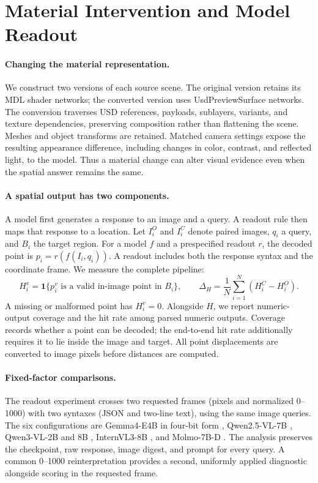\section{Material Intervention and Model Readout}
\label{sec:method}

\paragraph{Changing the material representation.}
We construct two versions of each source scene. The original version retains
its MDL shader networks; the converted version uses UsdPreviewSurface networks.
The conversion traverses USD references, payloads, sublayers, variants, and
texture dependencies, preserving composition rather than flattening the scene.
Meshes and object transforms are retained. Matched camera settings expose the
resulting appearance difference, including changes in color, contrast, and
reflected light, to the model. Thus a material change can alter visual evidence
even when the spatial answer remains the same.

\paragraph{A spatial output has two components.}
A model first generates a response to an image and a query. A readout rule then
maps that response to a location. Let $I_i^O$ and $I_i^C$ denote paired images,
$q_i$ a query, and $B_i$ the target region. For a model $f$ and a prespecified
readout $r$, the decoded point is $p_i=r(f(I_i,q_i))$. A readout includes both
the response syntax and the coordinate frame. We measure the complete pipeline:
\begin{equation}
 H_i^v = \mathbf{1}\{p_i^v\text{ is a valid in-image point in } B_i\},
 \qquad
 \Delta_H = \frac{1}{N}\sum_{i=1}^{N}(H_i^C-H_i^O).
 \label{eq:hit}
\end{equation}
A missing or malformed point has $H_i^v=0$. Alongside $H$, we report
numeric-output coverage and the hit rate among
parsed numeric outputs. Coverage records whether a point can be decoded; the
end-to-end hit rate additionally requires it to lie inside the image and target.
All point displacements are
converted to image pixels before distances are computed.

\paragraph{Fixed-factor comparisons.}
The readout experiment crosses two requested frames (pixels and normalized
0--1000) with two syntaxes (JSON and two-line text), using the same image queries.
The six configurations are Gemma4-E4B in four-bit form
\citep{Google2026Gemma4}, Qwen2.5-VL-7B \citep{Bai2025Qwen},
Qwen3-VL-2B and 8B \citep{Bai2025Qwen3}, InternVL3-8B
\citep{Zhu2025InternVL}, and Molmo-7B-D \citep{Deitke2024Molmo}. The analysis preserves the
checkpoint, raw response, image digest, and prompt for every query. A common
0--1000 reinterpretation provides a second, uniformly applied diagnostic
alongside scoring in the requested frame.

